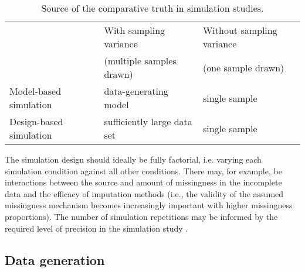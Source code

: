 \documentclass[bimj,fleqn]{w-art}
\begin{document}
\begin{table}[tb]
\begin{center}
\caption{Source of the comparative truth in simulation studies.}
\label{table:dgm_truth}
\begin{tabular}{lll}
\hline
               & With sampling variance      & Without sampling variance \\
               & (multiple samples drawn)    & (one sample drawn) \\
\hline  
Model-based simulation   & data-generating model         & single sample \\
Design-based simulation  & sufficiently large data set   & single sample \\
\hline
\end{tabular}
\end{center}
\end{table}

The simulation design should ideally be fully factorial, i.e. varying each simulation condition against all other conditions. There may, for example, be interactions between the source and amount of missingness in the incomplete data and the efficacy of imputation methods (i.e., the validity of the assumed missingness mechanism becomes increasingly important with higher missingness proportions). The number of simulation repetitions may be informed by the required level of precision in the simulation study \citep[e.g. as determined from a maximum tolerable level of uncertainty in terms of a performance measure's Monte Carlo error][]{morr18}. 



\subsection{Data generation}

\end{document}
